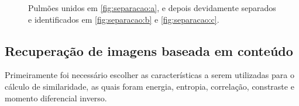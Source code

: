 \begin{figure}[!ht]
 \begin{center}
 \end{center}
 \caption{Pulmões unidos em \ref{fig:separacao:a}, e depois devidamente separados e identificados em \ref{fig:separacao:b} e \ref{fig:separacao:c}.}
 \label{fig:separacao}
\end{figure}

\subsection{Recuperação de imagens baseada em conteúdo}

Primeiramente foi necessário escolher as características a serem utilizadas para o cálculo de similaridade, as quais foram energia, entropia, correlação, constraste e momento diferencial inverso.

